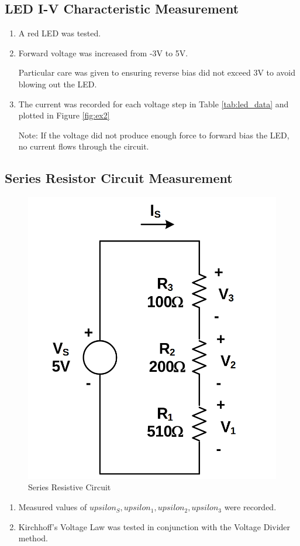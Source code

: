 \documentclass[12pt]{article}
\begin{document}
\subsection{LED I-V Characteristic Measurement}
\begin{enumerate}
	\item A red LED was tested.
	\item Forward voltage was increased from -3V to 5V.


	      Particular care was given to ensuring reverse bias did not exceed 3V to
	      avoid blowing out the LED.


	\item The current was recorded for each voltage step in Table
	      \ref{tab:led_data} and plotted in Figure \ref{fig:ex2}

	      Note: If the voltage did not produce enough force to forward bias the
	      LED, no current flows through the circuit.
\end{enumerate}

\subsection{Series Resistor Circuit Measurement}

\begin{figure}[H]
	\center
	\includegraphics[scale=.2]{exp3}
	\caption{Series Resistive Circuit}
	\label{fig:exp3}
\end{figure}
\begin{enumerate}
	\item Measured values of \( upsilon_S, upsilon_1, upsilon_2, upsilon_3 \) were recorded.
	\item Kirchhoff’s Voltage Law was tested in conjunction with the Voltage
	      Divider method.
\end{enumerate}
\end{document}

